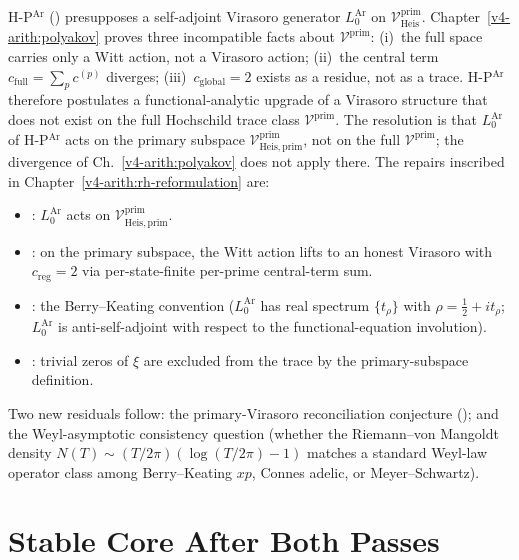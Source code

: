 H-P\(^{\mathrm{Ar}}\) () presupposes a
self-adjoint Virasoro generator \(L_{0}^{\mathrm{Ar}}\) on
\(\mathcal{V}^{\mathrm{prim}}_{\mathrm{Heis}}\). Chapter~\ref{v4-arith:polyakov}
proves three incompatible facts about \(\mathcal{V}^{\mathrm{prim}}\):
(i)~the full space carries only a Witt action, not a Virasoro action;
(ii)~the central term \(c_{\mathrm{full}}=\sum_{p}c^{(p)}\) diverges;
(iii)~\(c_{\mathrm{global}}=2\) exists as a residue, not as a trace.
H-P\(^{\mathrm{Ar}}\) therefore postulates a functional-analytic
upgrade of a Virasoro structure that does not exist on the full
Hochschild trace class \(\mathcal{V}^{\mathrm{prim}}\).
The resolution is that \(L_{0}^{\mathrm{Ar}}\) of H-P\(^{\mathrm{Ar}}\)
acts on the primary subspace
\(\mathcal{V}^{\mathrm{prim}}_{\mathrm{Heis},\mathrm{prim}}\),
not on the full \(\mathcal{V}^{\mathrm{prim}}\); the divergence of
Ch.~\ref{v4-arith:polyakov} does not apply there.
The repairs inscribed in Chapter~\ref{v4-arith:rh-reformulation} are:
\begin{itemize}
\item {}: \(L_{0}^{\mathrm{Ar}}\)
acts on \(\mathcal{V}^{\mathrm{prim}}_{\mathrm{Heis},\mathrm{prim}}\).
\item {}: on the primary
subspace, the Witt action lifts to an honest Virasoro with
\(c_{\mathrm{reg}}=2\) via per-state-finite per-prime central-term sum.
\item {}: the
Berry--Keating convention
(\(L_{0}^{\mathrm{Ar}}\) has real spectrum \(\{t_{\rho}\}\) with
\(\rho=\tfrac{1}{2}+it_{\rho}\); \(L_{0}^{\mathrm{Ar}}\) is
anti-self-adjoint with respect to the functional-equation involution).
\item {}: trivial zeros of \(\xi\)
are excluded from the trace by the primary-subspace definition.
\end{itemize}
Two new residuals follow: the primary-Virasoro reconciliation conjecture
(); and the Weyl-asymptotic
consistency question (whether the Riemann--von Mangoldt density
\(N(T)\sim(T/2\pi)(\log(T/2\pi)-1)\) matches a standard Weyl-law
operator class among Berry--Keating \(xp\), Connes adelic, or
Meyer--Schwartz).

\section{Stable Core After Both Passes}
\label{v4-arith:sw:wave2-heals}

